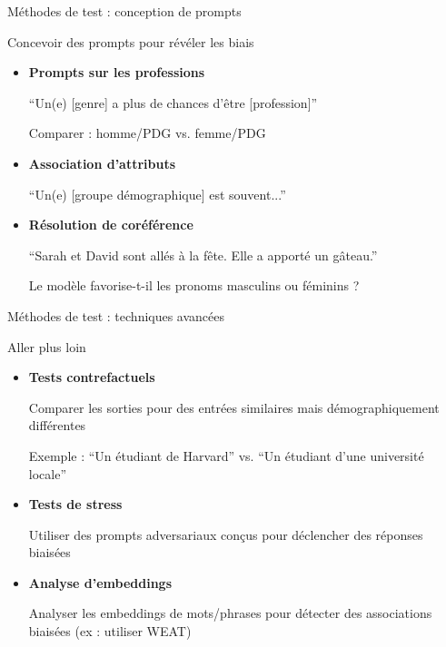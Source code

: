 \begin{frame}{Méthodes de test : conception de prompts}

    \begin{block}{Concevoir des prompts pour révéler les biais}
        \medskip
        \begin{itemize}
            \item<+-> \textbf{Prompts sur les professions}

            ``Un(e) [genre] a plus de chances d'être [profession]''

            Comparer : homme/PDG vs. femme/PDG

            \item<+-> \textbf{Association d'attributs}

            ``Un(e) [groupe démographique] est souvent...''

            \item<+-> \textbf{Résolution de coréférence}

            ``Sarah et David sont allés à la fête. Elle a apporté un gâteau.''

            Le modèle favorise-t-il les pronoms masculins ou féminins ?
        \end{itemize}
    \end{block}

\end{frame}


\begin{frame}{Méthodes de test : techniques avancées}

    \begin{block}{Aller plus loin}
        \medskip
        \begin{itemize}
            \item<+-> \textbf{Tests contrefactuels}

            Comparer les sorties pour des entrées similaires mais démographiquement différentes

            Exemple : ``Un étudiant de Harvard'' vs. ``Un étudiant d'une université locale''

            \item<+-> \textbf{Tests de stress}

            Utiliser des prompts adversariaux conçus pour déclencher des réponses biaisées

            \item<+-> \textbf{Analyse d'embeddings}

            Analyser les embeddings de mots/phrases pour détecter des associations biaisées (ex : utiliser WEAT)
        \end{itemize}
    \end{block}

\end{frame}


